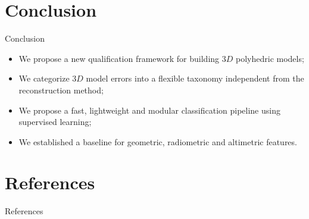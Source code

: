 \documentclass{beamer}
\begin{document}
    \section{Conclusion}
        \begin{frame}{Conclusion}
            \begin{itemize}[label=$\blacktriangleright$, font=\color{IGNGreen}]
                \item<1-> We propose a new qualification framework for building $3D$ polyhedric models;
                \item<2-> We categorize $3D$ model errors into a flexible taxonomy independent from the reconstruction method;
                \item<3-> We propose a fast, lightweight and modular classification pipeline using supervised learning;
                \item<4-> We established a baseline for geometric, radiometric and altimetric features.
            \end{itemize}
        \end{frame}
    \section*{References}
        \begin{frame}[allowframebreaks]{References}
            \printbibliography
        \end{frame}
\end{document}
